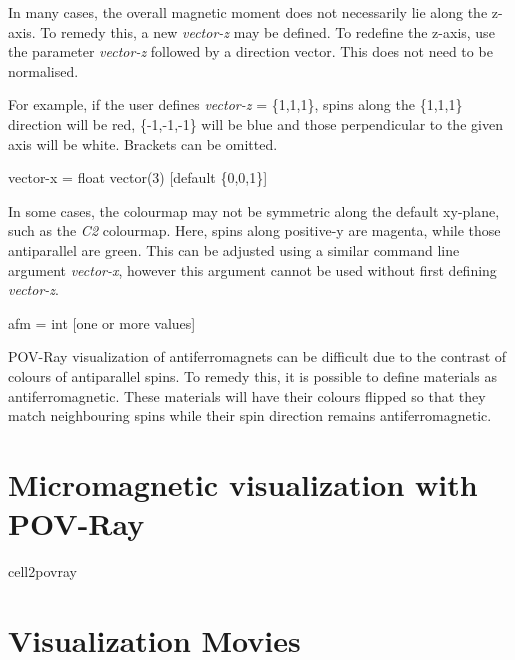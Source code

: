 In many cases, the overall magnetic moment does not necessarily lie along the
z-axis. To remedy this, a new \textit{vector-z} may be defined. To redefine the
z-axis, use the parameter \textit{vector-z} followed by a direction vector. This
does not need to be normalised.

For example, if the user defines \textit{vector-z} = \{1,1,1\}, spins along the
\{1,1,1\} direction will be red, \{-1,-1,-1\} will be blue and those
perpendicular to the given axis will be white. Brackets can be omitted.

{\zicf vector-x = float vector(3) [default \{0,0,1\}]}
 In some cases, the
colourmap may not be symmetric along the default xy-plane, such as the
\textit{C2} colourmap. Here, spins along positive-y are magenta, while those
antiparallel are green. This can be adjusted using a similar command line
argument \textit{vector-x}, however this argument cannot be used without first
defining \textit{vector-z}.

{\zicf afm = int [one or more values] }
 POV-Ray visualization of
antiferromagnets can be difficult due to the contrast of colours of antiparallel
spins. To remedy this, it is possible to define materials as antiferromagnetic.
These materials will have their colours flipped so that they match neighbouring
spins while their spin direction remains antiferromagnetic.

\section*{Micromagnetic visualization with POV-Ray}
cell2povray




\section*{Visualization Movies}
